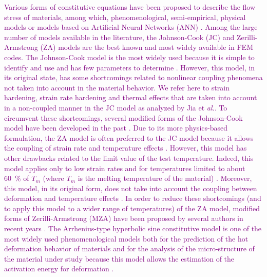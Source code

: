 \documentclass[twoside,english,1p,final,sort&compress]{elsarticle}
\makeatletter
\theoremstyle{plain}
\DeclareRobustCommand{\eal}{et \emph{al.}\@\xspace}
\makeatother
\begin{document}
\textcolor{purple}{Various forms of constitutive equations have been proposed to describe the flow stress of materials, among which, phenomenological, semi-empirical, physical models or models based on Artificial Neural Networks (ANN) \cite{Rusinek-2010, Shin-2010, Lin-2011, Pantale-2021}. Among the large number of models available in the literature, the Johnson-Cook (JC) \cite{Johnson-1983} and Zerilli-Armstrong (ZA) \cite{Zerilli-1987} models are the best known and most widely available in FEM codes.
The Johnson-Cook model is the most widely used because it is simple to identify and use and has few parameters to determine \cite{NematNasser-2003, Khan-2004}.
However, this model, in its original state, has some shortcomings related to nonlinear coupling phenomena not taken into account in the material behavior.
We refer here to strain hardening, strain rate hardening and thermal effects that are taken into account in a non-coupled manner in the JC model as analyzed by Jia \eal \cite{Jia-2021}. To circumvent these shortcomings, several modified forms of the Johnson-Cook model have been developed in the past \cite{Rule-1998, Vural-2003, Lin-2010, Lin-2012, Li-2013, Zhang-2015, Zhou-2019}.
Due to its more physics-based formulation, the ZA model is often preferred to the JC model because it allows the coupling of strain rate and temperature effects \cite{Johnson-1988, Voyiadjis-2005, Dey-2007}.
However, this model has other drawbacks related to the limit value of the test temperature. Indeed, this model applies only to low strain rates and for temperatures limited to about 60~\% of $T_m$ (where $T_m$ is the melting temperature of the material) \cite{Chiou-2005, Lee-2005, Lee-2006, Chen-2007}.
Moreover, this model, in its original form, does not take into account the coupling between deformation and temperature effects \cite{Samantaray-2009}.
In order to reduce these shortcomings (and to apply this model to a wider range of temperatures) of the ZA model, modified forms of Zerilli-Armstrong (MZA) have been proposed by several authors in recent years \cite{NematNasser-2004, Lennon-2004, Muralli-2017, Cheng-2021, Muralli-2021}. The Arrhenius-type hyperbolic sine constitutive model is one of the most widely used phenomenological models both for the prediction of the hot deformation behavior of materials and for the analysis of the micro-structure of the material under study because this model allows the estimation of the activation energy for deformation \cite{Jonas-1969, Mostafaei-2012, Zhang-2012}.
}
\end{document}
